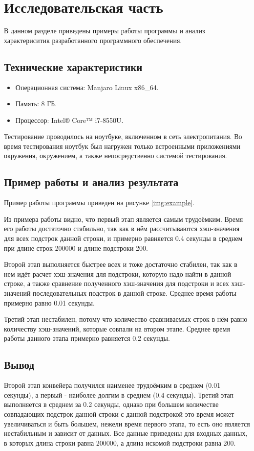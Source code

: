 \chapter{Исследовательская часть}

В данном разделе приведены примеры работы программы и анализ характериситик разработанного программного обеспечения.

\section{Технические характеристики}

\begin{itemize}
	\item Операционная система: Manjaro \cite{manjaro} Linux \cite{linux} x86\_64.
	\item Память: 8 ГБ.
	\item Процессор: Intel® Core™ i7-8550U\cite{intel}.
\end{itemize}

Тестирование проводилось на ноутбуке, включенном в сеть электропитания. Во время тестирования ноутбук был нагружен только встроенными приложениями окружения, окружением, а также непосредственно системой тестирования.

\section{Пример работы и анализ результата}

Пример работы программы приведен на рисунке \ref{img:example}.


Из примера работы видно, что первый этап является самым трудоёмким. Время его работы достаточно стабильно, так как в нём рассчитываются хэш-значения для всех подстрок данной строки, и примерно равняется 0.4 секунды в среднем при длине строк 200000 и длине подстроки 200.

Второй этап выполняется быстрее всех и тоже достаточно стабилен, так как в нем идёт расчет хэш-значения для подстроки, которую надо найти в данной строке, а также сравнение полученного хэш-значения для подстроки и всех хэш-значений последовательных подстрок в данной строке. Среднее время работы примерно равно 0.01 секунды.

Третий этап нестабилен, потому что количество сравниваемых строк в нём равно количеству хэш-значений, которые совпали на втором этапе. Среднее время работы данного этапа примерно равняется 0.2 секунды.

\section*{Вывод}

Второй этап конвейера получился наименее трудоёмким в среднем (0.01 секунды), а первый - наиболее долгим в среднем (0.4 секунды). Третий этап выполняется в среднем за 0.2 секунды, однако при большем количестве совпадающих подстрок данной строки с данной подстрокой это время может увеличиваться и быть большем, нежели время первого этапа, то есть оно является нестабильным и зависит от данных. Все данные приведены для входных данных, в которых длина строки равна 200000, а длина искомой подстроки равна 200.
